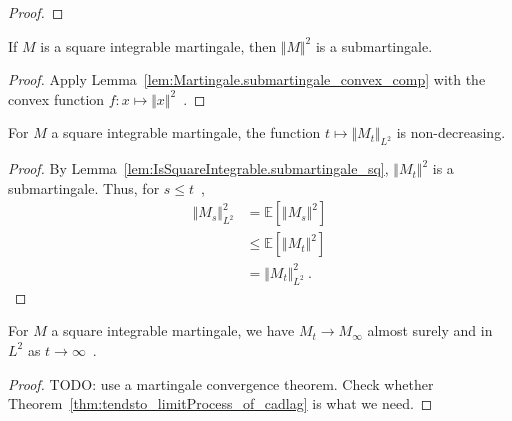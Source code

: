 \begin{proof}
\end{proof}


\begin{lemma}\label{lem:IsSquareIntegrable.submartingale_sq}
  \leanok
If $M$ is a square integrable martingale, then $\Vert M \Vert^2$ is a submartingale.
\end{lemma}

\begin{proof}
  \leanok
Apply Lemma~\ref{lem:Martingale.submartingale_convex_comp} with the convex function $f: x \mapsto \Vert x \Vert^2$~.
\end{proof}


\begin{lemma}\label{lem:IsSquareIntegrable.eLpNorm_two_mono}
  \leanok
For $M$ a square integrable martingale, the function $t \mapsto \Vert M_t \Vert_{L^2}$ is non-decreasing.
\end{lemma}

\begin{proof}
  \leanok
By Lemma~\ref{lem:IsSquareIntegrable.submartingale_sq}, $\Vert M_t \Vert^2$ is a submartingale.
Thus, for $s \le t$~,
\begin{align*}
  \Vert M_s \Vert_{L^2}^2
  &= \mathbb{E}[\Vert M_s \Vert^2]
  \\
  &\le \mathbb{E}[\Vert M_t \Vert^2]
  \\
  &= \Vert M_t \Vert_{L^2}^2
  \: .
\end{align*}
\end{proof}


\begin{lemma}\label{lem:IsSquareIntegrable.tendsto_limitProcess}
For $M$ a square integrable martingale, we have $M_t \to M_\infty$ almost surely and in $L^2$ as $t \to \infty$~.
\end{lemma}

\begin{proof}
TODO: use a martingale convergence theorem. Check whether Theorem~\ref{thm:tendsto_limitProcess_of_cadlag} is what we need.
\end{proof}


